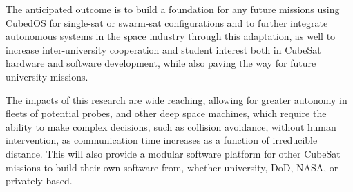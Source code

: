 The anticipated outcome is to build a foundation for any future missions using CubedOS for single-sat or swarm-sat configurations and to further integrate autonomous systems in the space industry through this adaptation, as well to increase inter-university cooperation and student interest both in CubeSat hardware and software development, while also paving the way for future university missions.
	
The impacts of this research are wide reaching, allowing for greater autonomy in fleets of potential probes, and other deep space machines, which require the ability to make complex decisions, such as collision avoidance, without human intervention, as communication time increases as a function of irreducible distance. This will also provide a modular software platform for other CubeSat missions to build their own software from, whether university, DoD, NASA, or privately based. 


